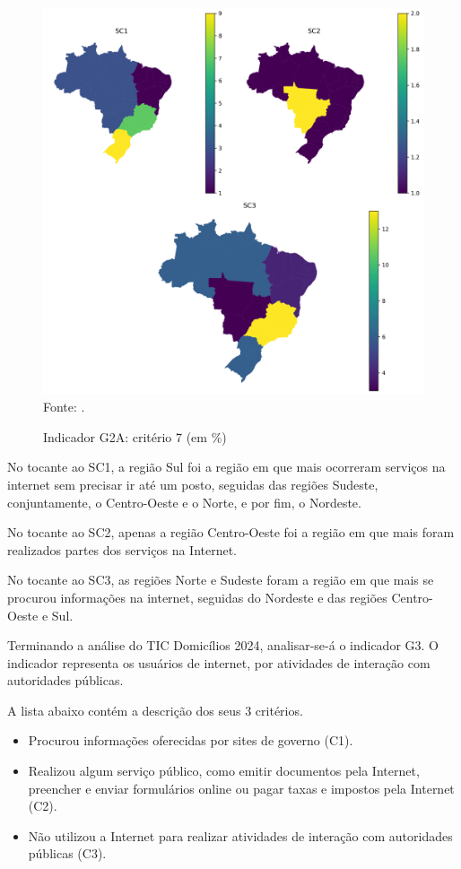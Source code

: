 \begin{figure}[H]
	\centering
	\caption{Indicador G2A: critério 7 (em \%)}
	\includegraphics[width=1\linewidth]{figuras/mapa_coropletico_tic_domicilios_2024_g2a_7.png}
	\label{fig:mapa_coropletico_tic_domicilios_2024_g2a_7}
	\footnotesize{Fonte: \cite{tic_domicilios_2024_g2a}.}
\end{figure}

No tocante ao SC1, a região Sul foi a região em que mais ocorreram serviços na internet sem precisar ir até um posto, seguidas das regiões Sudeste, conjuntamente, o Centro-Oeste e o Norte, e por fim, o Nordeste.

No tocante ao SC2, apenas a região Centro-Oeste foi a região em que mais foram realizados partes dos serviços na Internet.

No tocante ao SC3, as regiões Norte e Sudeste foram a região em que mais se procurou informações na internet, seguidas do Nordeste e das regiões Centro-Oeste e Sul.

Terminando a análise do TIC Domicílios 2024, analisar-se-á o indicador G3. O indicador representa os usuários de internet, por atividades de interação com autoridades públicas.

A lista abaixo contém a descrição dos seus 3 critérios.  

\begin{itemize}
	\item Procurou informações oferecidas por sites de governo (C1).
	\item Realizou algum serviço público, como emitir documentos pela Internet, preencher e enviar formulários online ou pagar taxas e impostos pela Internet (C2).
	\item Não utilizou a Internet para realizar atividades de interação com autoridades públicas (C3).
\end{itemize}

